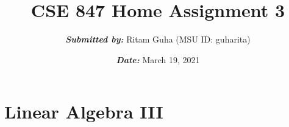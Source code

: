 \documentclass[11pt]{article}
\title{\textbf{CSE 847 Home Assignment 3}}
\author{\textbf{\textit{Submitted by:}} Ritam Guha (MSU ID: guharita)}
\date{\textbf{\textit{Date:}} March 19, 2021}
\begin{document}
\maketitle

\thispagestyle {empty}

\newcommand{\lsp}[1]{\large\renewcommand{\baselinestretch}{#1}\normalsize}
\newcommand{\hsp}{\hspace{.2in}}
\newcommand{\comment}[1]{}
\newtheorem{thm}{Theorem}[section]
\newtheorem{lem}{Lemma}[section]
\newtheorem{cor}{Corollary}[section]
\newtheorem{prop}{Proposition}[section]
\newtheorem{problem}{Problem}[section]

\newcommand{\R}{{\rm\hbox{I\kern-.15em R}}}
\newcommand{\IR}{{\rm\hbox{I\kern-.15em R}}}
\newcommand{\II}{{\rm\hbox{I\kern-.15em I}}}
\newcommand{\IN}{{\rm\hbox{I\kern-.15em N}}}
\newcommand{\IZ}{{\sf\hbox{Z\kern-.40em Z}}}
\newcommand{\IS}{{\rm\hbox{S\kern-.45em S}}}
\newcommand{\Real}{I\!\!R}


\newcommand{\linesep}{\vspace{.2cm}\hrule\vspace{0.2cm}}
\newcommand{\categorysep}{\vspace{0.5cm}}
\newcommand{\entrysep}{\vspace{0cm}}

\newcommand{\category}[1]{\categorysep
                  \noindent {\bf \large #1}
              \linesep}

\pagestyle{empty}

\section{Linear Algebra III}
\end{document}
